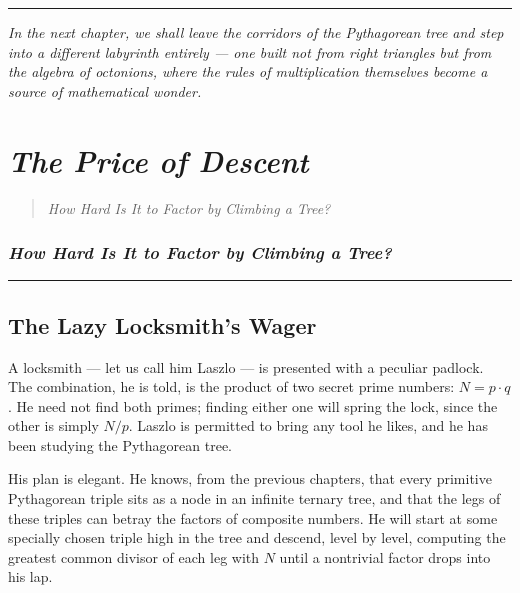 \documentclass[11pt,openany]{book}
\theoremstyle{definition}
\theoremstyle{plain}
\theoremstyle{remark}
\begin{document}
\bigskip\noindent\rule{\textwidth}{0.4pt}\bigskip


\textit{In the next chapter, we shall leave the corridors of the Pythagorean tree and step into a different labyrinth entirely — one built not from right triangles but from the algebra of octonions, where the rules of multiplication themselves become a source of mathematical wonder.}

\clearpage

\chapter{\textit{The Price of Descent}}
\begin{quote}\textit{How Hard Is It to Factor by Climbing a Tree?}\end{quote}



\subsection*{\textit{How Hard Is It to Factor by Climbing a Tree?}}


\bigskip\noindent\rule{\textwidth}{0.4pt}\bigskip


\section*{The Lazy Locksmith's Wager}


A locksmith — let us call him Laszlo — is presented with a peculiar padlock. The combination, he is told, is the product of two secret prime numbers: $N = p \cdot q$. He need not find both primes; finding either one will spring the lock, since the other is simply $N / p$. Laszlo is permitted to bring any tool he likes, and he has been studying the Pythagorean tree.

His plan is elegant. He knows, from the previous chapters, that every primitive Pythagorean triple sits as a node in an infinite ternary tree, and that the legs of these triples can betray the factors of composite numbers. He will start at some specially chosen triple high in the tree and descend, level by level, computing the greatest common divisor of each leg with $N$ until a nontrivial factor drops into his lap.
\end{document}

